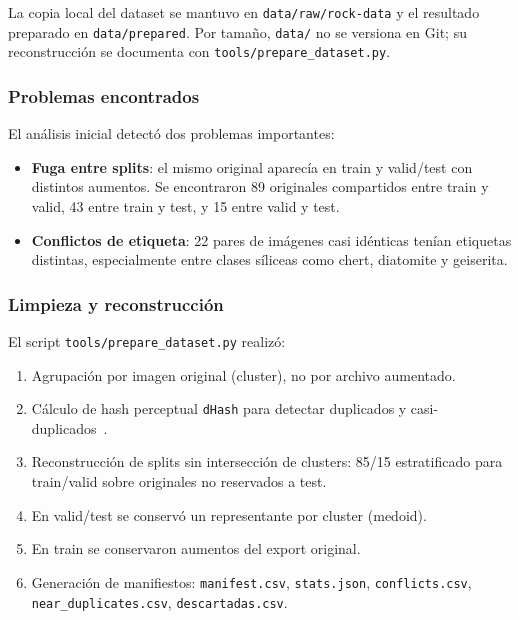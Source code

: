 La copia local del dataset se mantuvo en \texttt{data/raw/rock-data} y el resultado
preparado en \texttt{data/prepared}. Por tamaño, \texttt{data/} no se versiona en
Git; su reconstrucción se documenta con \texttt{tools/prepare\_dataset.py}.

\subsubsection{Problemas encontrados}

El análisis inicial detectó dos problemas importantes:

\begin{itemize}
  \item \textbf{Fuga entre splits}: el mismo original aparecía en train y valid/test
        con distintos aumentos. Se encontraron 89 originales compartidos entre train
        y valid, 43 entre train y test, y 15 entre valid y test.
  \item \textbf{Conflictos de etiqueta}: 22 pares de imágenes casi idénticas tenían
        etiquetas distintas, especialmente entre clases síliceas como chert,
        diatomite y geiserita.
\end{itemize}

\subsubsection{Limpieza y reconstrucción}

El script \texttt{tools/prepare\_dataset.py} realizó:

\begin{enumerate}
  \item Agrupación por imagen original (cluster), no por archivo aumentado.
  \item Cálculo de hash perceptual \texttt{dHash} para detectar duplicados y
        casi-duplicados~\cite{zauner2010implementation}.
  \item Reconstrucción de splits sin intersección de clusters: 85/15 estratificado
        para train/valid sobre originales no reservados a test.
  \item En valid/test se conservó un representante por cluster (medoid).
  \item En train se conservaron aumentos del export original.
  \item Generación de manifiestos: \texttt{manifest.csv}, \texttt{stats.json},
        \texttt{conflicts.csv}, \texttt{near\_duplicates.csv}, \texttt{descartadas.csv}.
\end{enumerate}

